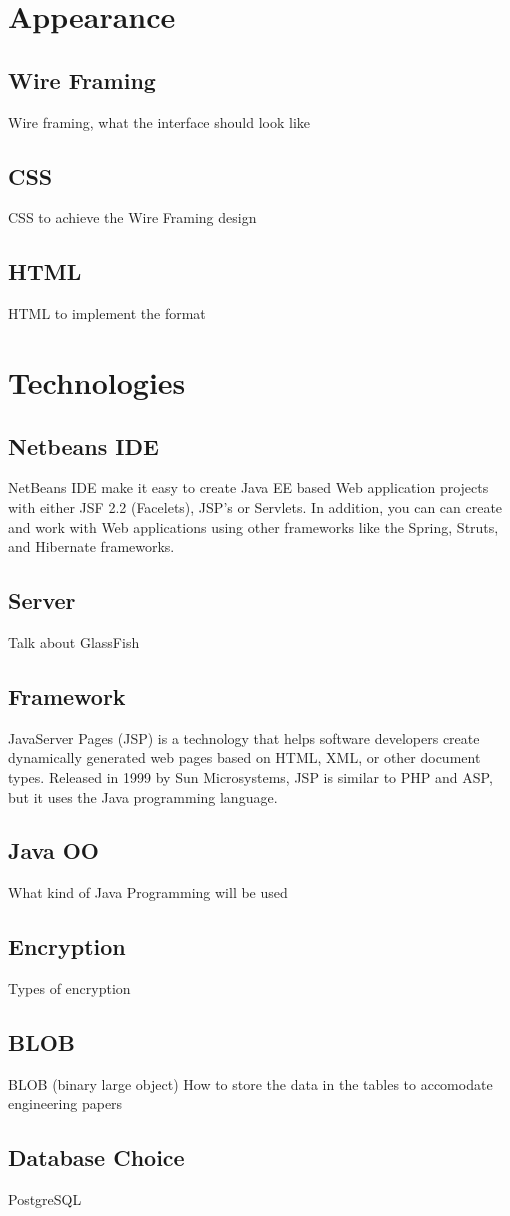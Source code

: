 \section{Appearance}

\subsection{Wire Framing}
Wire framing, what the interface should look like
\subsection{CSS}
CSS to achieve the Wire Framing design
\subsection{HTML}
HTML to implement the format

\section{Technologies}

\subsection{Netbeans IDE}
NetBeans IDE make it easy to create Java EE based Web application projects with either JSF 2.2 (Facelets), JSP's or Servlets. In addition, you can can create and work with Web applications using other frameworks like the Spring, Struts, and Hibernate frameworks.
\subsection{Server}
Talk about GlassFish
\subsection{Framework}
JavaServer Pages (JSP) is a technology that helps software developers create dynamically generated web pages based on HTML, XML, or other document types. Released in 1999 by Sun Microsystems, JSP is similar to PHP and ASP, but it uses the Java programming language.
\subsection{Java OO}
What kind of Java Programming will be used
\subsection{Encryption}
Types of encryption
\subsection{BLOB}
BLOB (binary large object) How to store the data in the tables to accomodate engineering papers
\subsection{Database Choice}
PostgreSQL

